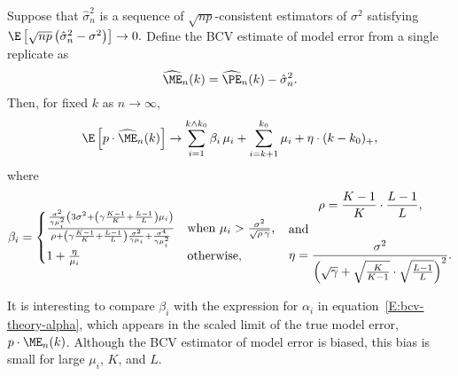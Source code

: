 \begin{theorem}\label{T:bcv-expected-me}
	Suppose that $\hat \sigma_n^2$ is a sequence of
	$\sqrt{n p}$-consistent estimators of $\sigma^2$ satisfying
	\(
		\E\left[
			\sqrt{n p}
				\left(
				\hat \sigma_n^2
				-
				\sigma^2
			\right)
		\right]
		\to
		0.
	\)
	Define the BCV estimate of model error from a single replicate as
	\begin{equation}
		\widehat{\ME}_n(k)
			=
				\widehat{\PE}_n(k)
				-
				\hat \sigma_n^2.
	\end{equation}
	Then, for fixed $k$ as $n\to\infty$,
	\begin{equation}
		\E \left[ p \cdot \widehat{\ME}_n(k) \right]
			\to
				\sum_{i=1}^{k \wedge k_0}
					\beta_i \, \mu_i
				+
				\sum_{i=k+1}^{k_0}
					\mu_i
				+
				\eta
				\cdot
				(k - k_0)_+,
	\end{equation}
	where
	\begin{subequations}
	\begin{align}
		\beta_i
			&=
				\begin{cases}
					\frac{
			            \frac{\sigma^2}{\gamma \mu_{i}^2}
			            \left(
			                3 \sigma^2
			                +
							\left(
								\gamma
								\frac{K-1}{K}
								+
								\frac{L-1}{L}
							\right)
			                \mu_{i}
			            \right)
			        }
			        {
			            \rho
			            +
						\left(
							\gamma
							\frac{K-1}{K}
							+
							\frac{L-1}{L}
						\right)
			            \frac{\sigma^2}{\gamma \mu_{i}}
			            +
			            \frac{\sigma^4}{\gamma \mu_{i}^2}
			        }&\text{when $\mu_{i} > 
								  \frac{\sigma^2}{\sqrt{\rho \, \gamma}}$,} \\
					1 + \frac{\eta}{\mu_i}&\text{otherwise,}
				\end{cases}
	\end{align}
	\begin{gather}
		\rho
			=
				\frac{K-1}{K}
				\cdot
				\frac{L-1}{L}, \\
    \intertext{and}
		\eta
			=
				\frac{\sigma^2}
				     {\left(
					      \sqrt{\gamma}
						  +
						  \sqrt{\frac{K}{K-1}} 
						  \cdot 
						  \sqrt{\frac{L-1}{L}}
					  \right)^{2}
					 }.
	\end{gather}
    \end{subequations}
\end{theorem}

It is interesting to compare $\beta_i$ with the expression for $\alpha_i$ in equation~\eqref{E:bcv-theory-alpha}, which appears in the scaled limit of the true model error, $p \cdot \ME_n(k)$.  Although the BCV 
estimator of model error is biased, this bias is small for large 
$\mu_i$, $K$, and $L$.

